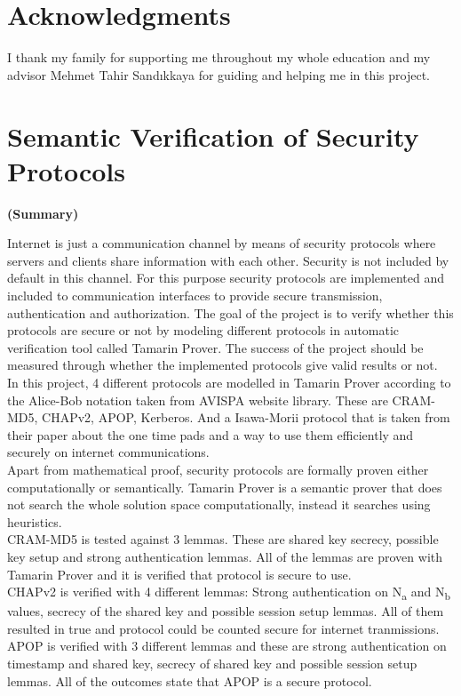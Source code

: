 \documentclass[a4paper, 12pt, titlepage]{article}
\begin{document}
\newpage
\section*{Acknowledgments}
I thank my family for supporting me throughout my whole education and my advisor Mehmet Tahir Sandıkkaya for guiding and helping me in this project.
\newpage
\section*{Semantic Verification of Security Protocols}
\centerline{\large\bfseries (Summary)}
Internet is just a communication channel by means of security protocols where servers and clients share information with each other. Security is not included by default in this channel. For this purpose security protocols are implemented and included to communication interfaces to provide secure transmission, authentication and authorization. The goal of the project is to verify whether this protocols are secure or not by modeling different protocols in automatic verification tool called Tamarin Prover. The success of the project should be measured through whether the implemented protocols give valid results or not.
\bigskip
\\In this project, 4 different protocols are modelled in Tamarin Prover according to the Alice-Bob notation taken from AVISPA website library. These are CRAM-MD5, CHAPv2, APOP, Kerberos. And a Isawa-Morii protocol that is taken from their paper about the one time pads and a way to use them efficiently and securely on internet communications.
\bigskip
\\Apart from mathematical proof, security protocols are formally proven either computationally or semantically. Tamarin Prover is a semantic prover that does not search the whole solution space computationally, instead it searches using heuristics.
\bigskip
\\CRAM-MD5 is tested against 3 lemmas. These are shared key secrecy, possible key setup and strong authentication lemmas. All of the lemmas are proven with Tamarin Prover and it is verified that protocol is secure to use.
\bigskip
\\CHAPv2 is verified with 4 different lemmas: Strong authentication on N\textsubscript{a} and N\textsubscript{b} values, secrecy of the shared key and possible session setup lemmas. All of them resulted in true and protocol could be counted secure for internet tranmissions.
\bigskip
\\APOP is verified with 3 different lemmas and these are strong authentication on timestamp and shared key, secrecy of shared key and possible session setup lemmas. All of the outcomes state that APOP is a secure protocol.
\end{document}
